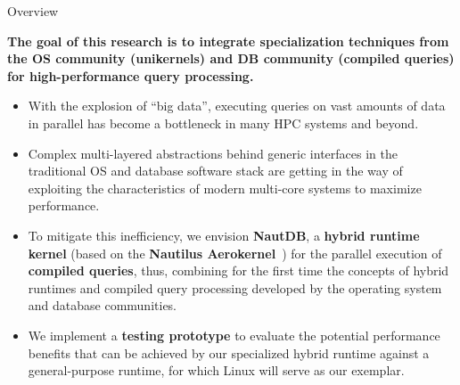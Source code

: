 



\begin{block}{Overview}
\begin{overviewbox}
    \textbf{The goal of this research is to integrate specialization techniques from the OS community
      (unikernels) and  DB community (compiled queries) for high-performance query processing.}
\end{overviewbox}
  \begin{itemize}
  \item   With the explosion of ``big data'', executing queries on vast amounts of data in parallel has become a bottleneck in many HPC systems and beyond.
  \item   Complex multi-layered abstractions behind generic interfaces in the traditional OS and database software stack are getting in the way of exploiting the characteristics of modern multi-core systems to maximize performance.
  \item   To mitigate this inefficiency, we envision \textbf{NautDB}, a \textbf{hybrid runtime kernel} (based on the \textbf{Nautilus Aerokernel}~\cite{HALE:2015:NAUTILUS}) for the parallel execution of \textbf{compiled queries}, thus, combining for the first time the concepts of hybrid runtimes and compiled query processing developed by the operating system and database communities.
  \item   We implement a \textbf{testing prototype} to evaluate the potential performance benefits that can be achieved by our specialized hybrid runtime against a general-purpose runtime, for which Linux will serve as our exemplar.
  \end{itemize}
\end{block}

